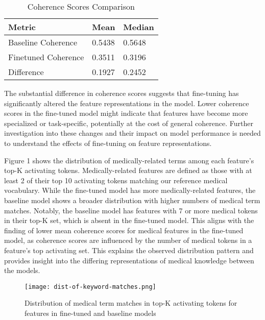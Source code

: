 \begin{table}[h]
\centering
\footnotesize
\begin{tabularx}{\columnwidth}{@{}lXX@{}}
\toprule
\textbf{Metric} & \textbf{Mean} & \textbf{Median} \\
\midrule
Baseline Coherence & 0.5438 & 0.5648 \\
Finetuned Coherence & 0.3511 & 0.3196 \\
Difference & 0.1927 & 0.2452 \\
\bottomrule
\end{tabularx}
\caption{Coherence Scores Comparison}
\label{tab:coherence_scores}
\end{table}

The substantial difference in coherence scores suggests that fine-tuning has significantly altered the feature representations in the model. Lower coherence scores in the fine-tuned model might indicate that features have become more specialized or task-specific, potentially at the cost of general coherence. Further investigation into these changes and their impact on model performance is needed to understand the effects of fine-tuning on feature representations.

Figure 1 shows the distribution of medically-related terms among each feature's top-K activating tokens. Medically-related features are defined as those with at least 2 of their top 10 activating tokens matching our reference medical vocabulary. While the fine-tuned model has more medically-related features, the baseline model shows a broader distribution with higher numbers of medical term matches. Notably, the baseline model has features with 7 or more medical tokens in their top-K set, which is absent in the fine-tuned model. This aligns with the finding of lower mean coherence scores for medical features in the fine-tuned model, as coherence scores are influenced by the number of medical tokens in a feature's top activating set. This explains the observed distribution pattern and provides insight into the differing representations of medical knowledge between the models.
\begin{figure}[htbp]
    \centering
    \vspace{-1em} %
    \texttt{[image: dist-of-keyword-matches.png]}
    \vspace{-1em} %
    \caption{Distribution of medical term matches in top-K activating tokens for features in fine-tuned and baseline models}
\end{figure}


